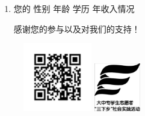 \documentclass{article}
\begin{document}
\begin{spacing}{1.0}
\begin{enumerate}
A.社区宣传\qquad B.亲戚朋友推荐\qquad C.医生\qquad
D.电视\qquad
E.互联网\qquad
F.其他途径（填写）\underline{\makebox[6em]{}}

\item 
您的
性别\underline{\makebox[6em]{}}
年龄\underline{\makebox[6em]{}}
学历\underline{\makebox[6em]{}}
年收入情况\underline{\makebox[6em]{}}

感谢您的参与以及对我们的支持！
\end{enumerate}
\begin{figure}
    \begin{minipage}{3cm}
    \flushleft
\includegraphics[width=3cm]{qrcode.jpg}
    \end{minipage}
\begin{minipage}{2cm}
 \flushleft
    \includegraphics[width=2cm]{xiaxiang.png}
\end{minipage}
\end{figure}
\end{spacing}
\end{document}

